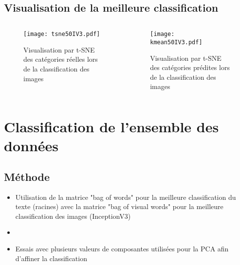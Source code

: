 \documentclass[8pt,aspectratio=169,hyperref={unicode=true}]{beamer}
\begin{document}
\subsection{Visualisation de la meilleure classification}
\begin{frame}{\insertsubsection}
    \begin{columns}
        \begin{column}{.5\textwidth}
            \begin{figure}
                \texttt{[image: tsne50IV3.pdf]}
                \caption{Visualisation par t-SNE des catégories réelles lors de la classification des images}
            \end{figure}
        \end{column}
        \begin{column}{.5\textwidth}
            \begin{figure}
                \texttt{[image: kmean50IV3.pdf]}
                \caption{Visualisation par t-SNE des catégories prédites lors de la classification des images}
            \end{figure}
        \end{column}
    \end{columns}
\end{frame}


\section{Classification de l'ensemble des données}

\subsection{Méthode}
\begin{frame}{\insertsubsection}
    \begin{itemize}
        \item Utilisation de la matrice "bag of words" pour la meilleure classification du texte (racines) avec la matrice "bag of visual words" pour la meilleure classification des images (InceptionV3)
        \item[]
        \item Essais avec plusieurs valeurs de composantes utilisées pour la PCA afin d'affiner la classification
    \end{itemize}
\end{frame}
\end{document}
